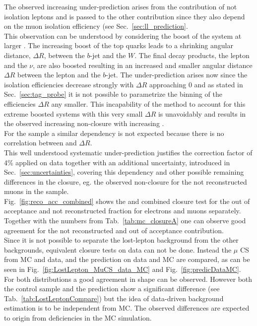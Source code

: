 The observed increasing under-prediction arises from the contribution of not isolation leptons and is passed to the other contribution since they also depend on the muon isolation efficiency (see Sec.~\ref{sec:ll_prediction}.\\
This observation can be understood by considering the boost of the \ttbar system at larger \MHT. The increasing boost of the top quarks leads to a shrinking angular distance, $\Delta R$, between the $b$-jet and the $W$. The final decay products, the lepton and the $\nu$, are also boosted resulting in an increased \MHT and smaller angular distance $\Delta R$ between the lepton and the $b$-jet. The under-prediction arises now since the isolation efficiencies decrease strongly with $\Delta R$ approaching 0 and as stated in Sec.~\ref{sec:tag_probe} it is not possible to parametrize the binning of the efficiencies $\Delta R$ any smaller. This incapability of the method to account for this extreme boosted systems with this very small $\Delta R$ is unavoidably and results in the observed increasing non-closure with increasing \MHT.\\
For the \wpj sample a similar dependency is not expected because there is no correlation between \MHT and $\Delta R$.\\ 
This well understood systematic under-prediction justifies the correction factor of 4\% applied on data together with an additional uncertainty, introduced in Sec.~\ref{sec:uncertainties}, covering this dependency and other possible remaining differences in the closure, eg. the observed non-closure for the not reconstructed muons in the \wpj sample.\\
Fig.~\ref{fig:reco_acc_combined} shows the \ttbar and \wpj combined closure test for the out of acceptance and not reconstructed fraction for electrons and muons separately. Together with the numbers from Tab.~\ref{tab:mc_closureA} one can observe good agreement for the not reconstructed and out of acceptance contribution.\\
Since it is not possible to separate the lost-lepton background from the other backgrounds, equivalent closure tests on data can not be done. Instead the $\mu$ CS from MC and data, and the prediction on data and MC are compared, as can be seen in Fig.~\ref{fig:LostLepton_MuCS_data_MC} and Fig.~\ref{fig:predicDataMC}. \\
For both distributions a good agreement in shape can be observed. However both the control sample and the prediction show a significant difference (see Tab.~\ref{tab:LostLeptonCompare}) but the idea of data-driven background estimation is to be independent from MC. The observed differences are expected to origin from deficiencies in the MC simulation.\\ 
